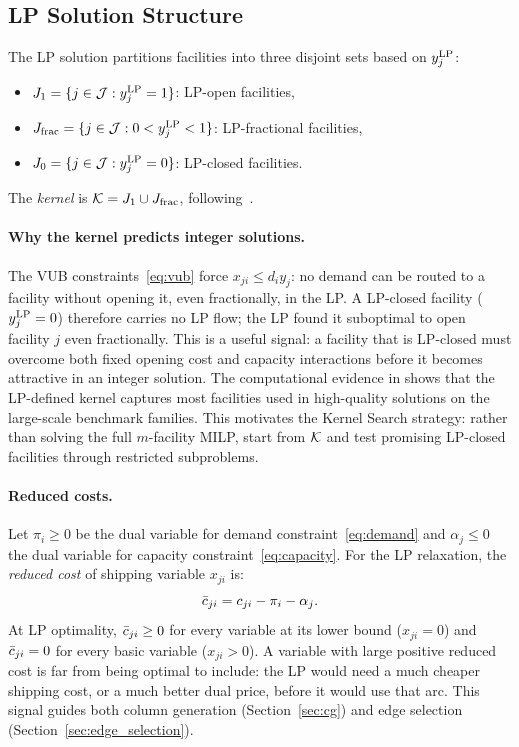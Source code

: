 \subsection{LP Solution Structure}
\label{sec:lp_structure}

The LP solution partitions facilities into three disjoint sets based on
$y^{\text{LP}}_j$:
\begin{itemize}
  \item $J_1 = \{j \in \mathcal{J} : y^{\text{LP}}_j = 1\}$: LP-open facilities,
  \item $J_{\text{frac}} = \{j \in \mathcal{J} : 0 < y^{\text{LP}}_j < 1\}$: LP-fractional
        facilities,
  \item $J_0 = \{j \in \mathcal{J} : y^{\text{LP}}_j = 0\}$: LP-closed facilities.
\end{itemize}
The \emph{kernel} is $\mathcal{K} = J_1 \cup J_{\text{frac}}$, following~\citet{guastaroba2012kernel}.

\paragraph{Why the kernel predicts integer solutions.}
The VUB constraints~\eqref{eq:vub} force $x_{ji} \leq d_i y_j$: no demand
can be routed to a facility without opening it, even fractionally, in the LP.
A LP-closed facility ($y^{\text{LP}}_j = 0$) therefore carries no LP flow; the LP
found it suboptimal to open facility $j$ even fractionally.
This is a useful signal: a facility that is LP-closed must overcome both fixed
opening cost and capacity interactions before it becomes attractive in an
integer solution.
The computational evidence in \citet{guastaroba2012kernel} shows that the
LP-defined kernel captures most facilities used in high-quality solutions on the
large-scale benchmark families.
This motivates the Kernel Search strategy: rather than solving the full
$m$-facility MILP, start from $\mathcal{K}$ and test promising LP-closed facilities
through restricted subproblems.

\paragraph{Reduced costs.}
Let $\pi_i \geq 0$ be the dual variable for demand constraint~\eqref{eq:demand}
and $\alpha_j \leq 0$ the dual variable for capacity
constraint~\eqref{eq:capacity}.
For the LP relaxation, the \emph{reduced cost} of shipping variable $x_{ji}$
is:
\begin{equation}
  \bar{c}_{ji} = c_{ji} - \pi_i - \alpha_j.
  \label{eq:rc}
\end{equation}
At LP optimality, $\bar{c}_{ji} \geq 0$ for every variable at its lower bound
($x_{ji} = 0$) and $\bar{c}_{ji} = 0$ for every basic variable ($x_{ji} > 0$).
A variable with large positive reduced cost is far from being optimal to
include: the LP would need a much cheaper shipping cost, or a much better
dual price, before it would use that arc.
This signal guides both column generation (Section~\ref{sec:cg}) and
edge selection (Section~\ref{sec:edge_selection}).

